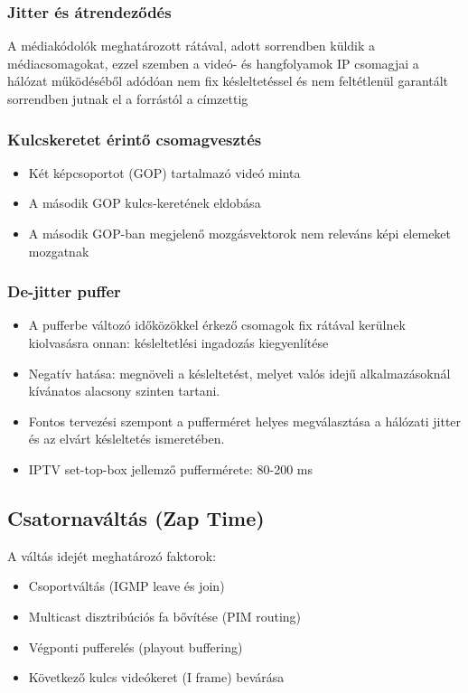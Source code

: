 \documentclass[10pt,a4paper]{article}
\begin{document}
\subsubsection{Jitter és átrendeződés}
A médiakódolók meghatározott rátával, adott sorrendben
küldik a médiacsomagokat, ezzel szemben a videó- és
hangfolyamok IP csomagjai a hálózat működéséből
adódóan nem fix késleltetéssel és nem feltétlenül garantált
sorrendben jutnak el a forrástól a címzettig
\subsubsection{Kulcskeretet érintő csomagvesztés}
\begin{itemize}
	\item Két képcsoportot
	(GOP) tartalmazó
	videó minta
	\item A második GOP
	kulcs-keretének
	eldobása
	\item A második GOP-ban
	megjelenő mozgásvektorok nem
	releváns képi
	elemeket mozgatnak
\end{itemize}
\subsubsection{De-jitter puffer}
\begin{itemize}
	\item A pufferbe változó időközökkel érkező csomagok fix
	rátával kerülnek kiolvasásra onnan: késleltetlési
	ingadozás kiegyenlítése
	\item  Negatív hatása: megnöveli a késleltetést, melyet valós
	idejű alkalmazásoknál kívánatos alacsony szinten
	tartani.
	\item  Fontos tervezési szempont a pufferméret helyes
	megválasztása a hálózati jitter és az elvárt késleltetés
	ismeretében.
	\item  IPTV set-top-box jellemző puffermérete: 80-200 ms
\end{itemize}
\subsection{Csatornaváltás (Zap Time)}
A váltás idejét meghatározó faktorok:
\begin{itemize}
	\item Csoportváltás (IGMP leave és join)
	\item  Multicast disztribúciós fa bővítése (PIM routing)
	\item  Végponti pufferelés (playout buffering)
	\item  Következő kulcs videókeret (I frame) bevárása
\end{itemize}
\end{document}
